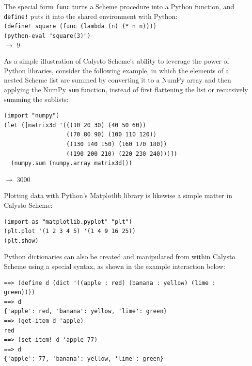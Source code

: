\documentclass[acmsmall,screen,nonacm]{acmart}
\begin{document}
\noindent
The special form \texttt{func} turns a Scheme procedure into a Python function,
and \texttt{define!} puts it into the shared environment with Python:\\

{\small
\noindent
\texttt{(define! square (func (lambda (n) (* n n))))}\\
\texttt{(python-eval "square(3)")}\\
$\rightarrow$ 9\\
}

\noindent
As a simple illustration of Calysto Scheme's ability to leverage the power of
Python libraries, consider the following example, in which the elements of a
nested Scheme list are summed by converting it to a NumPy array and then
applying the NumPy \texttt{sum} function, instead of first flattening the list
or recursively summing the sublists:\\

\noindent
\begin{minipage}{\textwidth}
{\small
\begin{verbatim}
(import "numpy")
(let ([matrix3d '(((10 20 30) (40 50 60))
                  ((70 80 90) (100 110 120))
                  ((130 140 150) (160 170 180))
                  ((190 200 210) (220 230 240)))])
  (numpy.sum (numpy.array matrix3d)))
\end{verbatim}
$\rightarrow$ 3000\\
}
\end{minipage}

\noindent
Plotting data with Python's Matplotlib library is likewise a simple matter in
Calysto Scheme:\\

{\small
\begin{verbatim}
(import-as "matplotlib.pyplot" "plt")
(plt.plot '(1 2 3 4 5) '(1 4 9 16 25))
(plt.show)

\end{verbatim}
}

\noindent
Python dictionaries can also be created and manipulated from within Calysto
Scheme using a special syntax, as shown in the example interaction below:\\

\noindent
\begin{minipage}{\textwidth}
{\small
\begin{verbatim}
==> (define d (dict '((apple : red) (banana : yellow) (lime : green))))
==> d
{'apple': red, 'banana': yellow, 'lime': green}
==> (get-item d 'apple)
red
==> (set-item! d 'apple 77)
==> d
{'apple': 77, 'banana': yellow, 'lime': green}
\end{verbatim}
}
\end{minipage}
\end{document}
